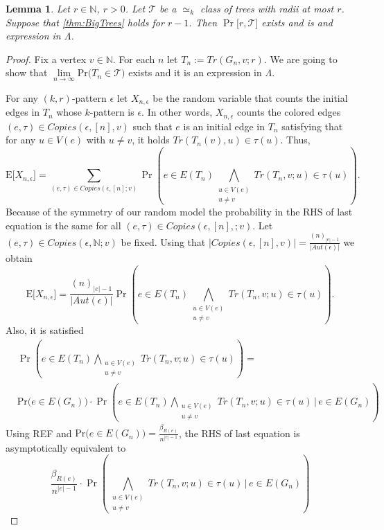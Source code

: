 \documentclass[12pt,notitlepage,a4paper]{article}
\newtheorem{lemma}{Lemma}[section]
\theoremstyle{definition}
\newcommand{\N}{\mathbb{N}}
\newcommand{\Ln}{\lim\limits_{n\to \infty}}
\newcommand{\PR}[1]{\mathrm{Pr}\big(#1\big)}
\begin{document}
	\newpage
	\begin{lemma}
	Let $r\in \N$, $r>0$. Let $\mathcal{T}$ be a 
	$\simeq_k$ class of trees with radii at most $r$.
	Suppose that \cref{thm:BigTrees} holds
	for $r-1$. Then $\Pr\big[r, \mathcal{T}\big]$ 
	exists and is and expression in $\Lambda$.   
	\end{lemma}
	\begin{proof}
		Fix a vertex $v\in \N$. For each $n$ let
		$T_n:=Tr(G_n,v;r)$. We are going to show that
		$\Ln \PR{T_n\in \mathcal{T}}$ exists and it is an 
		expression in $\Lambda$. \par
		For any $(k,r)$-pattern  $\epsilon$  let 
		$X_{n,\epsilon}$ be the random variable that counts
		the initial edges in $T_n$ whose $k$-pattern
		is $\epsilon$. In other words, $X_{n,\epsilon}$ counts
		the colored edges $(e,\tau)\in Copies(\epsilon,[n],v)$ 
		such that $e$ is an initial edge in $T_n$ satisfying that
		for any $u\in V(e)$ with $u\neq v$, it holds
		$Tr(T_n(v),u)\in \tau(u)$. Thus,
		\[
		\mathrm{E}\big[ X_{n,\epsilon} \big]
		= \sum_{(e,\tau)\in Copies(\epsilon,[n];v)} \Pr
		\left(e\in E(T_n)
		\bigwedge_{\substack{u\in V(e)\\ u\neq v} } Tr(T_{n}, v; u)\in 
		\tau(u) \right).
		\]
		Because of the symmetry of our random model the probability 
		in the RHS of last equation is the same for all 
		$(e,\tau)\in Copies(\epsilon,[n],;v)$. Let
		$(e,\tau)\in Copies(\epsilon,\N;v)$ be fixed. 
		Using that 
		$|Copies(\epsilon,[n],v)|=\frac{(n)_{|e|-1}}
		{|Aut(\epsilon)|}$ we obtain
		\[
		\mathrm{E}\big[ X_{n,\epsilon} \big]
		=
		\frac{(n)_{|e|-1}}{|
			Aut(\epsilon)|} \Pr
		\left(e\in E(T_{n})
		\bigwedge_{\substack{u\in V(e)\\ u\neq v} } Tr(T_n, v; u)\in \tau(u) \right).
		\]
		Also, it is satisfied
		\begin{align*}
		&\Pr
		\left( e\in E(T_{n})
		\bigwedge_{\substack{u\in V(e)\\ u\neq v} } Tr(T_n, v; u)\in 
		\tau(u) \right)=\\
		&\PR{ e\in E(G_n)} \cdot
		\Pr
		\left( e\in E(T_{n})
		\bigwedge_{\substack{u\in V(e)\\ u\neq v} } Tr(T_{n}, v; u)\in \tau(u) \, \Bigg| \,  e\in E(G_n) \right)
		\end{align*}
		Using REF and $\PR{e\in E(G_n)}=\frac{\beta_{R(e)}}{n^{|e|-1}}$, 
		the RHS of last equation is asymptotically equivalent
		to
		\[
		\frac{\beta_{R(e)}}{n^{|e|-1}} \cdot
		\Pr	\left(
		\bigwedge_{\substack{u\in V(e)\\ u\neq v} } Tr(T_{n}, v; u)\in \tau(u) \, \Bigg| \,  e\in E(G_n) \right)
\]
\end{proof}
\end{document}
